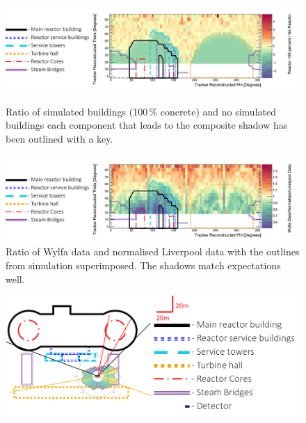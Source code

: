 \begin{figure}
  \centering
    \includegraphics[width=1\linewidth]{Chapter6/Figs/Raster/wylfaSimulatedShadowsWithKey.png}
    \caption{Ratio of simulated buildings (100\,\% concrete) and no simulated buildings each component that leads to the composite shadow has been outlined with a key.}
  \label{fig:simulatedTrackerRecon}
    \includegraphics[width=1\linewidth]{Chapter6/Figs/Raster/wylfaMeasuredShadowsWithKey.png}
    \caption{Ratio of Wylfa data and normalised Liverpool data with the outlines from simulation superimposed. The shadows match expectations well.}
  \label{fig:measuredTrackerRecon}
\end{figure}

\clearpage

\begin{figure}[!h]
 \centering
 \includegraphics[width=\linewidth]{Chapter5/Figs/wylfaRasterNew/wylfaCircular0-37.5Deg_Overlay_Updated.png}
 \label{fig:wylfaCircular0-37.5Deg_Overlay_Updated}
\end{figure}

